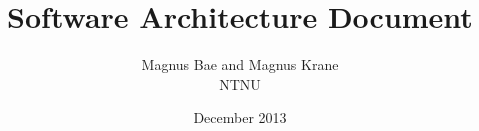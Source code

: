 \documentclass[english,10pt, oneside, a4paper]{article}
\begin{document}
\clearpage
\title{Software Architecture Document}
\author{Magnus Bae and Magnus Krane\\ NTNU}
\date{December 2013}

\makeatletter
\renewcommand{\l@section}{\@dottedtocline{1}{1.5em}{2.6em}}
\renewcommand{\l@subsection}{\@dottedtocline{2}{4.0em}{3.6em}}
\renewcommand{\l@subsubsection}{\@dottedtocline{3}{7.4em}{4.5em}}
\makeatother
\renewcommand{\thesection}{F.\arabic{section}}%

\setcounter{tocdepth}{5}
\setcounter{secnumdepth}{5}


\setcounter{page}{91}
\clearpage
\renewcommand\contentsname{Table of Contents}
\tableofcontents











\end{document}
